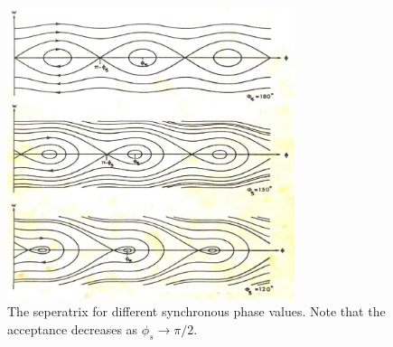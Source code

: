 \begin{figure}
\begin{center}
\includegraphics[width=0.75\textwidth]{appendices/figures/longPhaseDiag.png}
\end{center}
\caption{The seperatrix for different synchronous phase values. Note that the acceptance decreases as $\phi_{s} \rightarrow \pi / 2$.}
\label{fig:longSynFreq}
\end{figure}